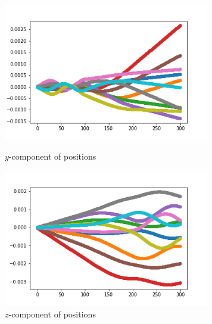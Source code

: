 \documentclass[12pt]{article}
\begin{document}
	\begin{figure}[H]
		\begin{multicols}{2}
			\includegraphics[width=\linewidth, height=6cm]{multipsy2.png} \caption{$y$-component of positions} \label{multipsy2} \par
			\includegraphics[width=\linewidth, height=6cm]{multipsz2.png} \caption{$z$-component of positions} \label{multipsz2} \par
		\end{multicols}
	\end{figure}
\end{document}
